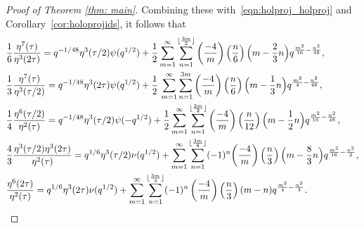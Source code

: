 \documentclass[11pt,reqno]{amsart}
\renewcommand{\=}{\;=\;}
\theoremstyle{myremark}
\begin{document}
\begin{proof}[Proof of Theorem \ref{thm: main}]
Combining these with~\eqref{eqn:holproj_holproj} and Corollary~\ref{cor:holoprojids}, it follows that
\begin{equation*}
\begin{aligned}
&
\frac{1}{6}\frac{\eta^7(\tau)}{\eta^3(2\tau)} = q^{-1/48}\eta^3(\tau/2)\psi(q^{1/2}) + \frac{1}{2}\sum_{m=1}^\infty \sum_{n=1}^{\lfloor {3m \over 2}\rfloor} \left({-4 \over m}\right) \left({n \over 6}\right) \Big( m-{2 \over 3}n \Big) q^{{m^2 \over 16}-{n^2 \over 48}},\\
&
\frac{1}{3}\frac{\eta^7(\tau)}{\eta^3(\tau/2)} = q^{-1/48}\eta^3(2\tau)\psi(q^{1/2}) + \frac{1}{2}\,\sum_{m=1}^\infty \sum_{n=1}^{3m} \left({-4 \over m}\right) \left({n \over 6}\right) \Big(m - {1 \over 3}n \Big) q^{{m^2 \over 4} - {n^2 \over 48}},\\
&
\frac{1}{4}\frac{\eta^6(\tau/2)}{\eta^2(\tau)} = q^{-1/48}\eta^3(\tau/2)\psi(-q^{1/2}) + \frac{1}{2}\sum_{m=1}^\infty \sum_{n=1}^{\lfloor {3m \over 2}\rfloor} \left({-4 \over m}\right) \left({n \over 12}\right) \Big( m-{1 \over 2}n \Big) q^{{m^2 \over 16}-{n^2 \over 48}},\\
&
\frac{4}{3}\frac{\eta^3(\tau/2)\eta^3(2\tau)}{\eta^2(\tau)} = q^{1/6}\eta^3(\tau/2)\nu(q^{1/2}) + \sum_{m=1}^\infty \sum_{n=1}^{\lfloor {3m \over 8}\rfloor} (-1)^n\! \left({-4 \over m}\right) \left({n \over 3}\right) \Big( m-{8 \over 3}n \Big) q^{{m^2 \over 16}-{n^2 \over 3}},\\
&
\frac{\eta^6(2\tau)}{\eta^2(\tau)} = q^{1/6}\eta^3(2\tau)\nu(q^{1/2}) + \sum_{m=1}^\infty \sum_{n=1}^{\lfloor {3m \over 4}\rfloor} (-1)^n \left({-4 \over m}\right) \left({n \over 3}\right) (m-n)q^{{m^2 \over 4}-{n^2 \over 3}}.
\end{aligned}
\end{equation*}


\end{proof}
\end{document}
